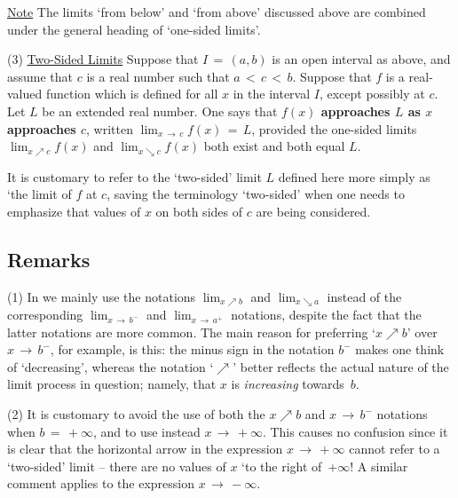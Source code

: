{\V

        \underline{Note} The limits `from below' and `from above' discussed above are combined under the general heading of `one-sided limits'.

\V

        (3) \underline{Two-Sided Limits}
    Suppose that $I \,=\, (a,b)$ is an open interval as above, and assume that $c$ is a real number such that 
$a\,<\,c\,<\,b$.
    Suppose that $f$ is a real-valued function which is defined for all $x$ in the interval $I$, except possibly at $c$.
    Let $L$ be an extended real number.
    One says that {\bf $f(x)$ approaches $L$ as $x$ approaches $c$}, written ${\displaystyle \lim_{x \,{\rightarrow}\, c} f(x) \,=\, L}$,
    provided the one-sided limits ${\displaystyle \lim_{x{\nearrow}c}} f(x)$ and ${\displaystyle \lim_{x{\searrow}c} f(x)}$ both exist and both equal $L$.

        It is customary to refer to the `two-sided' limit $L$ defined here more simply as `the limit of $f$ at $c$,
    saving the terminology `two-sided' when one needs to emphasize that values of $x$ on both sides of $c$ are being considered.

\V

            \subsection{\small{\bf Remarks}}
            \label{RemrkC90.12}

\V

\hspace*{\parindent}(1) In {\ThisText} we mainly use the notations ${\displaystyle \lim_{x{\nearrow}b}}$ and
    ${\displaystyle \lim_{x{\searrow}a}}$ instead of the corresponding ${\displaystyle \lim_{x \,{\rightarrow}\, b^{-}}}$ and
    ${\displaystyle \lim_{x \,{\rightarrow}\, a^{+}}}$ notations, despite the fact that the latter notations are more common.
    The main reason for preferring `${x\nearrow}b$' over $x \,{\rightarrow}\, b^{-}$, for example, is this:
    the minus sign in the notation $b^{-}$ makes one think of `decreasing', whereas the notation `${\nearrow}$'
    better reflects the actual nature of the limit process in question; namely, that $x$ is {\em increasing} towards~$b$.

\V

        (2) It is customary to avoid the use of both the $x{\nearrow}b$ and $x \,{\rightarrow}\, b^{-}$ notations when $b \,=\, +{\infty}$,
    and to use instead $x \,{\rightarrow}\, +{\infty}$. This causes no confusion since it is clear that the horizontal arrow in the expression
    $x \,{\rightarrow}\, +{\infty}$ cannot refer to a `two-sided' limit -- there are no values of $x$ `to the right of~$+{\infty}$!
    A similar comment applies to the expression $x \,{\rightarrow}\, -{\infty}$.

}
